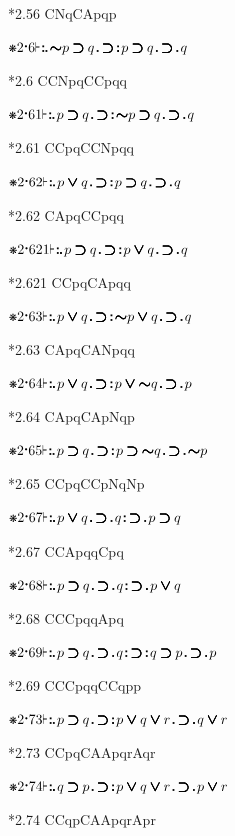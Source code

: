 \documentclass[12pt]{article}
\newcommand{\pmthm}{\mathpunct{\text{\scalebox{.5}[1]{$\boldsymbol\vdash$}}}} %
\newcommand{\pmast}{\text{\resizebox{!}{.75\height}{\ding{107}}}} %
\newcommand{\pmcdot}{\text{\raisebox{.05cm}{$\boldsymbol\cdot$}}} %
\newcommand{\pmd}{\hbox{\rule{.3ex}{.3ex}}} %
\newcommand{\pmdd}{\overset{\pmd}{\pmd}} %
\newcommand{\pmdot}{\mathinner{\pmd}}
\newcommand{\pmdott}{\mathinner{\pmdd}}
\newcommand{\pmdottt}{\mathinner{\pmdd\hspace{1pt}\pmd}}
\newcommand{\pmnot}{\mathord{\ooalign{$\boldsymbol{\sim}\mkern.5mu$\hidewidth\cr$\boldsymbol{\sim}$\cr\hidewidth$\mkern.5mu\boldsymbol{\sim}$}}}
\newcommand{\pmor}{\mathbin{\ooalign{$\boldsymbol{\vee}\mkern.5mu$\hidewidth\cr$\boldsymbol{\vee}$\cr\hidewidth$\mkern.5mu\boldsymbol{\vee}$}}}
\newcommand{\pmimp}{\mathbin{\ooalign{$\boldsymbol{\supset}\mkern.5mu$\hidewidth\cr$\boldsymbol{\supset}$\cr\hidewidth$\mkern.5mu\boldsymbol{\supset}$}}} %
\begin{document}
*2.56 CNqCApqp

$\pmast 2 \pmcdot 6 \pmthm \pmdottt \pmnot p \pmimp q \pmdot \pmimp \pmdott p \pmimp q \pmdot \pmimp \pmdot q    $

*2.6 CCNpqCCpqq

$\pmast 2 \pmcdot 61 \pmthm \pmdottt p \pmimp q \pmdot \pmimp \pmdott \pmnot p \pmimp q \pmdot \pmimp \pmdot q  $

*2.61 CCpqCCNpqq

$\pmast 2 \pmcdot 62 \pmthm \pmdottt p \pmor q \pmdot \pmimp \pmdott p \pmimp q \pmdot \pmimp \pmdot q    $

*2.62 CApqCCpqq

$\pmast 2 \pmcdot 621 \pmthm \pmdottt p \pmimp q \pmdot \pmimp \pmdott p \pmor q \pmdot \pmimp \pmdot q    $

*2.621 CCpqCApqq

$\pmast 2 \pmcdot 63 \pmthm \pmdottt p \pmor q \pmdot \pmimp \pmdott \pmnot p \pmor q \pmdot \pmimp \pmdot q    $

*2.63 CApqCANpqq

$\pmast 2 \pmcdot 64 \pmthm \pmdottt p \pmor q \pmdot \pmimp \pmdott p \pmor \pmnot q \pmdot \pmimp \pmdot p $

*2.64 CApqCApNqp

$\pmast 2 \pmcdot 65 \pmthm \pmdottt p \pmimp q \pmdot \pmimp \pmdott p \pmimp \pmnot q \pmdot \pmimp \pmdot \pmnot p      $

*2.65 CCpqCCpNqNp

$\pmast 2 \pmcdot 67 \pmthm \pmdottt p \pmor q \pmdot \pmimp \pmdot q \pmdott \pmimp \pmdot p \pmimp q     $

*2.67 CCApqqCpq

$\pmast 2 \pmcdot 68 \pmthm \pmdottt p \pmimp q \pmdot \pmimp \pmdot q \pmdott \pmimp \pmdot p \pmor q     $

*2.68 CCCpqqApq

$\pmast 2 \pmcdot 69 \pmthm \pmdottt p \pmimp q \pmdot \pmimp \pmdot q \pmdott \pmimp \pmdott q \pmimp p \pmdot \pmimp \pmdot p           $

*2.69 CCCpqqCCqpp

$\pmast 2 \pmcdot 73 \pmthm \pmdottt p \pmimp q \pmdot \pmimp \pmdott p \pmor q \pmor r \pmdot \pmimp \pmdot q \pmor r    $

*2.73 CCpqCAApqrAqr

$\pmast 2 \pmcdot 74 \pmthm \pmdottt q \pmimp p \pmdot \pmimp \pmdott p \pmor q \pmor r \pmdot \pmimp \pmdot p \pmor r     $

*2.74 CCqpCAApqrApr
\end{document}
